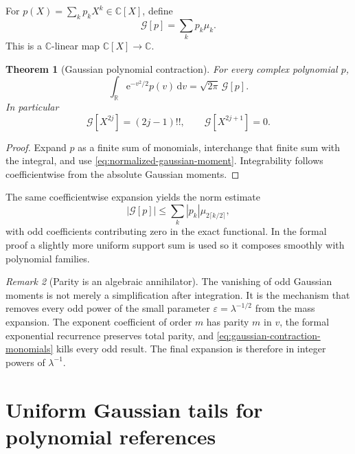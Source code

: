 \documentclass[11pt,oneside]{article}
\newtheorem{theorem}{Theorem}[section]
\theoremstyle{definition}
\theoremstyle{remark}
\newtheorem{remark}[theorem]{Remark}
\newcommand{\R}{\mathbb R}
\newcommand{\C}{\mathbb C}
\newcommand{\e}{\mathrm e}
\newcommand{\dd}{\,\mathrm d}
\newcommand{\Gcal}{\mathcal G}
\begin{document}
For $p(X)=\sum_kp_kX^k\in\C[X]$, define
\begin{equation}
 \Gcal[p]=\sum_kp_k\mu_k.
 \label{eq:gaussian-contraction-def}
\end{equation}
This is a $\C$-linear map $\C[X]\to\C$.

\begin{theorem}[Gaussian polynomial contraction]
\label{thm:gaussian-contraction}
For every complex polynomial $p$,
\begin{equation}
 \int_{\R}\e^{-v^2/2}p(v)\dd v
 =\sqrt{2\pi}\,\Gcal[p].
 \label{eq:gaussian-contraction-integral}
\end{equation}
In particular
\begin{equation}
 \Gcal[X^{2j}]=(2j-1)!!,
 \qquad
 \Gcal[X^{2j+1}]=0.
 \label{eq:gaussian-contraction-monomials}
\end{equation}
\end{theorem}

\begin{proof}
Expand $p$ as a finite sum of monomials, interchange that finite sum with the integral, and
use \eqref{eq:normalized-gaussian-moment}.  Integrability follows coefficientwise from the
absolute Gaussian moments.
\end{proof}

The same coefficientwise expansion yields the norm estimate
\begin{equation}
 \left|\Gcal[p]\right|
 \le\sum_k|p_k|\mu_{2\lceil k/2\rceil},
 \label{eq:gaussian-contraction-norm-bound}
\end{equation}
with odd coefficients contributing zero in the exact functional.  In the formal proof a
slightly more uniform support sum is used so it composes smoothly with polynomial families.

\begin{remark}[Parity is an algebraic annihilator]
The vanishing of odd Gaussian moments is not merely a simplification after integration.  It
is the mechanism that removes every odd power of the small parameter $\varepsilon=
\lambda^{-1/2}$ from the mass expansion.  The exponent coefficient of order $m$ has parity
$m$ in $v$, the formal exponential recurrence preserves total parity, and
\eqref{eq:gaussian-contraction-monomials} kills every odd result.  The final expansion is
therefore in integer powers of $\lambda^{-1}$.
\end{remark}

\section{Uniform Gaussian tails for polynomial references}
\label{sec:gaussian-tails}
\end{document}
